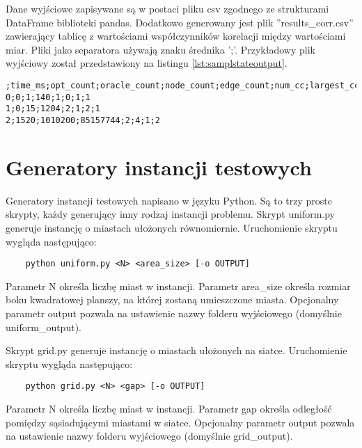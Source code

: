 Dane wyjściowe zapisywane są w postaci pliku csv zgodnego ze strukturami DataFrame biblioteki pandas.
Dodatkowo generowany jest plik ''results\_corr.csv'' zawierający tablicę z wartościami współczynników korelacji
między wartościami miar. Pliki jako separatora używają znaku średnika ';'.
Przykładowy plik wyjściowy został przedstawiony na listingu \ref{lst:samplstateoutput}.

\begin{lstlisting}[caption={Przykład pliku wyjściowego z obliczonymi miarami num\_cc i largest\_cc}, label=lst:samplstateoutput]
;time_ms;opt_count;oracle_count;node_count;edge_count;num_cc;largest_cc
0;0;1;140;1;0;1;1
1;0;15;1204;2;1;2;1
2;1520;1010200;85157744;2;4;1;2
\end{lstlisting}


\section{Generatory instancji testowych}

Generatory instancji testowych napisano w języku Python.
Są to trzy proste skrypty, każdy generujący inny rodzaj instancji problemu.
Skrypt uniform.py generuje instancję o miastach ułożonych równomiernie.
Uruchomienie skryptu wygląda następująco:
\begin{lstlisting}
    python uniform.py <N> <area_size> [-o OUTPUT]
\end{lstlisting}
Parametr N określa liczbę miast w instancji. Parametr area\_size określa rozmiar boku kwadratowej planszy, na której zostaną umieszczone miasta.
Opcjonalny parametr output pozwala na ustawienie nazwy folderu wyjściowego (domyślnie uniform\_output).

Skrypt grid.py generuje instancję o miastach ułożonych na siatce.
Uruchomienie skryptu wygląda następująco:
\begin{lstlisting}
    python grid.py <N> <gap> [-o OUTPUT]
\end{lstlisting}
Parametr N określa liczbę miast w instancji. Parametr gap określa odległość pomiędzy sąsiadującymi miastami w siatce.
Opcjonalny parametr output pozwala na ustawienie nazwy folderu wyjściowego (domyślnie grid\_output).

